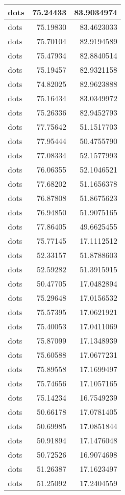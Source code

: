 \documentclass[
]{book}
\theoremstyle{definition}
\theoremstyle{definition}
\theoremstyle{definition}
\theoremstyle{definition}
\theoremstyle{remark}
\begin{document}
\begin{tabular}{l|r|r}
\hline
dots & 75.24433 & 83.9034974\\
\hline
dots & 75.19830 & 83.4623033\\
\hline
dots & 75.70104 & 82.9194589\\
\hline
dots & 75.47934 & 82.8840514\\
\hline
dots & 75.19457 & 82.9321158\\
\hline
dots & 74.82025 & 82.9623888\\
\hline
dots & 75.16434 & 83.0349972\\
\hline
dots & 75.26336 & 82.9452793\\
\hline
dots & 77.75642 & 51.1517703\\
\hline
dots & 77.95444 & 50.4755790\\
\hline
dots & 77.08334 & 52.1577993\\
\hline
dots & 76.06355 & 52.1046521\\
\hline
dots & 77.68202 & 51.1656378\\
\hline
dots & 76.87808 & 51.8675623\\
\hline
dots & 76.94850 & 51.9075165\\
\hline
dots & 77.86405 & 49.6625455\\
\hline
dots & 75.77145 & 17.1112512\\
\hline
dots & 52.33157 & 51.8788603\\
\hline
dots & 52.59282 & 51.3915915\\
\hline
dots & 50.47705 & 17.0482894\\
\hline
dots & 75.29648 & 17.0156532\\
\hline
dots & 75.57395 & 17.0621921\\
\hline
dots & 75.40053 & 17.0411069\\
\hline
dots & 75.87099 & 17.1348939\\
\hline
dots & 75.60588 & 17.0677231\\
\hline
dots & 75.89558 & 17.1699497\\
\hline
dots & 75.74656 & 17.1057165\\
\hline
dots & 75.14234 & 16.7549239\\
\hline
dots & 50.66178 & 17.0781405\\
\hline
dots & 50.69985 & 17.0851844\\
\hline
dots & 50.91894 & 17.1476048\\
\hline
dots & 50.72526 & 16.9074698\\
\hline
dots & 51.26387 & 17.1623497\\
\hline
dots & 51.25092 & 17.2404559\\

\end{tabular}
\end{document}
